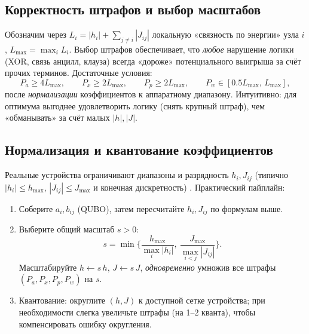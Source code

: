 \subsection{Корректность штрафов и выбор масштабов}
Обозначим через $L_i=|h_i|+\sum_{j\ne i}|J_{ij}|$ локальную «связность по энергии» узла $i$, $L_{\max}=\max_i L_i$. Выбор штрафов обеспечивает, что \emph{любое} нарушение логики (XOR, связь анцилл, клауза) всегда «дороже» потенциального выигрыша за счёт прочих терминов. Достаточные условия:
\[
P_a \ge 4L_{\max},\qquad
P_x \ge 2L_{\max},\qquad
P_p \ge 2L_{\max},\qquad
P_w \in [0.5L_{\max},\,L_{\max}],
\]
после \emph{нормализации} коэффициентов к аппаратному диапазону. Интуитивно: для оптимума выгоднее удовлетворить логику (снять крупный штраф), чем «обманывать» за счёт малых $|h|,|J|$.

\subsection{Нормализация и квантование коэффициентов}
Реальные устройства ограничивают диапазоны и разрядность $h_i,J_{ij}$ (типично $|h_i|\le h_{\max}$, $|J_{ij}|\le J_{\max}$ и конечная дискретность) \cite{DWaveDocs}. Практический пайплайн:
\begin{enumerate}
  \item Соберите $a_i,b_{ij}$ (QUBO), затем пересчитайте $h_i,J_{ij}$ по формулам выше.
  \item Выберите общий масштаб $s>0$:
  \[
  s=\min\Big\{\frac{h_{\max}}{\max_i |h_i|},\ \frac{J_{\max}}{\max_{i<j}|J_{ij}|}\Big\}.
  \]
  Масштабируйте $h\leftarrow s\,h$, $J\leftarrow s\,J$, \emph{одновременно} умножив все штрафы $(P_a,P_x,P_p,P_w)$ на $s$.
  \item Квантование: округлите $(h,J)$ к доступной сетке устройства; при необходимости слегка увеличьте штрафы (на 1–2 кванта), чтобы компенсировать ошибку округления.
\end{enumerate}

